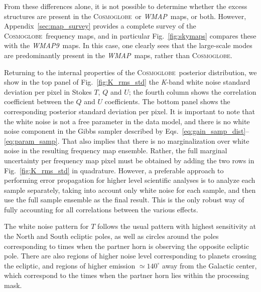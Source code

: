 \documentclass[twocolumn]{../../common/aa}
\def\WMAP{\emph{WMAP}}
\def\WMAPnine{\emph{WMAP9}}
\newcommand{\cosmoglobe}{\textsc{Cosmoglobe}}
\newcommand{\K}[0]{\textit K}
\begin{document}
From these differences alone, it is not possible to determine whether the excess structures are present in the \cosmoglobe\ or \WMAP\ maps, or both. However, Appendix~\ref{sec:map_survey} provides a complete survey of the \cosmoglobe\ frequency maps, and in particular Fig.~\ref{fig:skymaps} compares these with the \WMAPnine\ maps. In this case, one clearly sees that the large-scale modes are predominantly present in the \WMAP\ maps, rather than \cosmoglobe. 

Returning to the internal properties of the \cosmoglobe\ posterior distribution, we show in the top panel of Fig.~\ref{fig:K_rms_std} the \K-band white noise standard deviation per pixel in Stokes $T$, $Q$ and $U$; the fourth column shows the correlation coefficient between the $Q$ and $U$ coefficients. The bottom panel shows the corresponding posterior standard deviation per pixel. It is important to note that the white noise is not a free parameter in the data model, and there is no white noise component in the Gibbs sampler described by Eqs.~\eqref{eq:gain_samp_dist}--\eqref{eq:param_samp}. That also implies that there is no marginalization over white noise in the resulting frequency map ensemble. Rather, the full marginal uncertainty per frequency map pixel must be obtained by adding the two rows in Fig.~\ref{fig:K_rms_std} in quadrature. However, a preferable approach to performing error propagation for higher level scientific analyses is to analyze each sample separately, taking into account only white noise for each sample, and then use the full sample ensemble as the final result. This is the only robust way of fully accounting for all correlations between the various effects.  

The white noise pattern for $T$ follows the usual pattern with highest sensitivity at the North and South ecliptic poles, as well as circles around the poles corresponding to times when the partner horn is observing the opposite ecliptic pole. There are also regions of higher noise level corresponding to planets crossing the ecliptic, and regions of higher emission $\simeq140^\circ$ away from the Galactic center, which correspond to the times when the partner horn lies within the processing mask.
\end{document}
